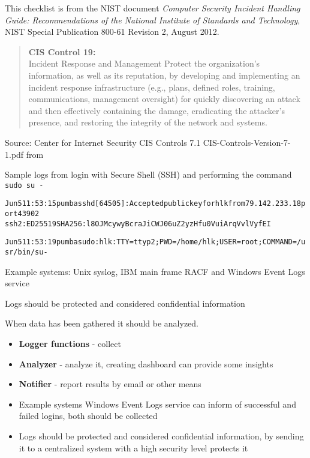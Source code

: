 \documentclass[Screen16to9,17pt]{foils}
\begin{document}

This checklist is from the NIST document
\emph{Computer Security Incident Handling Guide: Recommendations of the National Institute
of Standards and Technology}, NIST Special Publication 800-61
Revision 2, August 2012.


\begin{quote}{\bf
CIS Control 19:}\\
Incident Response and Management Protect the organization’s information, as well as its reputation, by developing and implementing an incident response infrastructure (e.g., plans, defined roles, training, communications, management oversight) for quickly discovering an attack and then effectively containing the damage, eradicating the attacker’s presence, and restoring the integrity of the network and systems.
\end{quote}

Source:
Center for Internet Security CIS Controls 7.1 CIS-Controls-Version-7-1.pdf
from 





Sample logs from login with Secure Shell (SSH) and performing the command \verb+sudo su -+
\begin{alltt}
Jun  5 11:53:15 pumba sshd[64505]: Accepted publickey for hlk from 79.142.233.18 port 43902
 ssh2: ED25519 SHA256:l8OJMcywyBcraJiCWJ06uZ2yzHfu0VuiArqVvlVyfEI

Jun  5 11:53:19 pumba sudo:      hlk : TTY=ttyp2 ; PWD=/home/hlk ; USER=root ; COMMAND=/usr/bin/su -
\end{alltt}

\begin{list1}
\item Example systems: Unix syslog, IBM main frame RACF and Windows Event Logs service
\item Logs should be protected and considered confidential information
\end{list1}




When data has been gathered it should be analyzed.

\begin{itemize}
\item {\bf Logger functions} - collect
\item {\bf Analyzer} - analyze it, creating dashboard can provide some insights
\item {\bf Notifier} - report results by email or other means
\item Example systems Windows Event Logs service can inform of successful and failed logins, both should be collected
\item Logs should be protected and considered confidential information, by sending it to a centralized system with a high security level protects it
\end{itemize}
\end{document}
